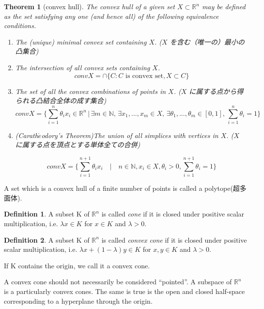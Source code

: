 \documentclass{jsarticle}
\newtheorem{thm}{Theorem}[section]
\theoremstyle{definition}
\newtheorem{dfn}{Definition}[section]
\begin{document}
\begin{thm}[convex hull]
The convex hull of a given set $X \subset \mathbb{R}^n $ may be defined as
the set satisfying any one (and hence all) of the following
equivalence conditions.
\begin{enumerate}
\item The (unique) minimal convex set containing $X$. ($X$
を含む（唯一の）最小の凸集合)
\item The intersection of all convex sets containing $X$. 
\[
conv X = \cap \{ C : C \text{ is convex set} ,  X \subset C \}
\]
\item The set of all the convex combinations of points in $X$.
($X$ に属する点から得られる凸結合全体の成す集合)
\[
conv X = \{ \sum \limits_{i=1}^n \theta_i x_i \in \mathbb{R}^n\, | \, \exists m \in \mathbb{N}, \, \exists x_1, ... , x_m \in X,    \, \exists \theta_1, ..., \theta_m \in [0, 1],  \, \sum \limits_{i=1}^n \theta_i = 1 \}
\]

\item (Carath$\acute{e}$odory's Theorem)The union of all simplices with vertices in $X$. ($X$
に属する点を頂点とする単体全ての合併)

\[
conv X = {\{ \sum \limits_{i=1}^{n+1} \theta_i x_i \quad |\quad n \in \mathbb{N}, x_i \in X, \theta_i > 0, \sum
\limits_{i=1}^{n+1} \theta_i = 1} \}
\]
\end{enumerate}
\end{thm}



A set which is a convex hull of a finite number of points is called a polytope(超多面体).\\

\begin{dfn}
A subset K of $\mathbb{R}^n$ is called \textit{cone} if it is closed under positive scalar multiplication, i.e. $\lambda x \in K$ for $x \in K$ and $  \lambda > 0$.  
\end{dfn}


\begin{dfn}
A subset K of $\mathbb{R}^n$ is called \textit{convex cone} if it is closed under positive scalar multiplication, i.e. $\lambda x + (1 - \lambda) y \in K$ for $x, y \in K$ and $  \lambda > 0$.  
\end{dfn}

If K contains the origin, we call it a convex cone.

A convex cone should not necessarily be considered ``pointed''.
A subspace of $\mathbb{R}^n$ is a particularly convex cones.
The same is true is the open and closed half-space corresponding to a hyperplane through the origin.
\end{document}

